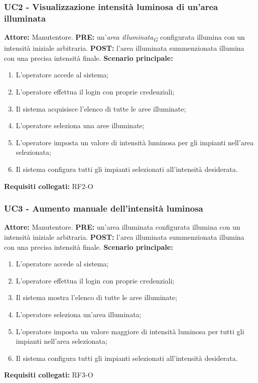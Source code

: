 \documentclass[a4paper, 12pt]{article}
\begin{document}
\subsubsection{UC2 - Visualizzazione intensità luminosa di un'area illuminata}
\textbf{Attore:} Manutentore.\newline
\textbf{PRE:} un'\textit{area illuminata\textsubscript{G}} configurata illumina con un intensità iniziale arbitraria.\newline
\textbf{POST:} l'area illuminata summenzionata illumina con una precisa intensità finale.\newline
\textbf{Scenario principale:}
\begin{enumerate}
    \item L'operatore accede al sistema;
    \item L'operatore effettua il login con proprie credenziali;
    \item Il sistema acquisisce l'elenco di tutte le aree illuminate;
    \item L'operatore seleziona una aree illuminate;
    \item L'operatore imposta un valore di intensità luminosa per gli impianti nell'area selezionata;
    \item Il sistema configura tutti gli impianti selezionati all'intensità desiderata.
\end{enumerate}
\textbf{Requisiti collegati:} RF2-O\newline



\subsubsection{UC3 - Aumento manuale dell'intensità luminosa}
\textbf{Attore:} Manutentore.\newline
\textbf{PRE:} un'area illuminata configurata illumina con un intensità iniziale arbitraria.\newline
\textbf{POST:} l'area illuminata summenzionata illumina con una precisa intensità finale.\newline
\textbf{Scenario principale:}
\begin{enumerate}
    \item L'operatore accede al sistema;
    \item L'operatore effettua il login con proprie credenziali;
    \item Il sistema mostra l'elenco di tutte le aree illuminate;
    \item L'operatore seleziona un'area illuminata;
    \item L'operatore imposta un valore maggiore di intensità luminosa per tutti gli impianti nell'area selezionata;
    \item Il sistema configura tutti gli impianti selezionati all'intensità desiderata.
\end{enumerate}
\textbf{Requisiti collegati:} RF3-O\newline
\end{document}
